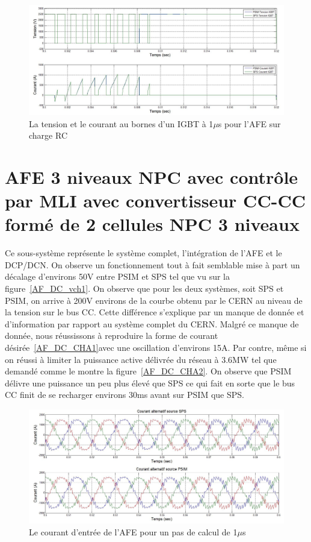 \begin{figure}[htb]
\centering
\includegraphics[scale=0.5]{fig/com_afe.jpg}
\caption{La tension et le courant au bornes d'un IGBT à 1$\mu$s pour l'AFE sur charge RC}
\label{AF_RC_igbt}
\end{figure}

\clearpage
\section{AFE 3 niveaux NPC avec contrôle par MLI avec convertisseur CC-CC formé de 2 cellules NPC 3 niveaux}
Ce sous-système représente le système complet, l'intégration de l'AFE et le DCP/DCN. On observe un fonctionnement tout à fait semblable mise à part un décalage d'environs 50V entre PSIM et SPS tel que vu sur la figure~\ref{AF_DC_vch1}. On observe que pour les deux systèmes, soit SPS et PSIM, on arrive à 200V environs de la courbe obtenu par le CERN au niveau de la tension sur le bus CC. Cette différence s'explique par un manque de donnée et d'information par rapport au système complet du CERN. Malgré ce manque de donnée, nous réussissons à reproduire la forme de courant désirée~\ref{AF_DC_CHA1}avec une oscillation d'environs 15A. Par contre, même si on réussi à limiter la puissance active délivrée du réseau à 3.6MW tel que demandé comme le montre la figure~\ref{AF_DC_CHA2}. On observe que PSIM délivre une puissance un peu plus élevé que SPS ce qui fait en sorte que le bus CC finit de se recharger environs 30ms avant sur PSIM que SPS.


\begin{figure}[htb]
\centering
\includegraphics[scale=0.5]{fig/DCP_AFE/1u/cour_al.jpg}
\caption{Le courant d'entrée de l'AFE pour un pas de calcul de 1$\mu$s}
\label{AF_DC_cou1}
\end{figure}


